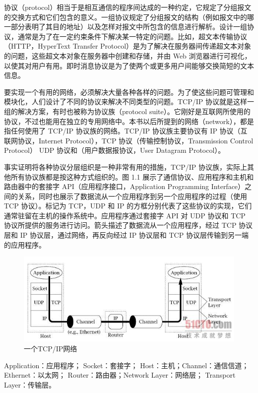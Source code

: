 		协议（protocol）相当于是相互通信的程序间达成的一种约定，它规定了分组报文的交换方式和它们包含的意义。一组协议规定了分组报文的结构（例如报文中的哪一部分表明了其目的地址）以及怎样对报文中所包含的信息进行解析。设计一组协议，通常是为了在一定约束条件下解决某一特定的问题。比如，超文本传输协议（HTTP，HyperText Transfer Protocol）是为了解决在服务器间传递超文本对象的问题，这些超文本对象在服务器中创建和存储，并由 Web 浏览器进行可视化，以使其对用户有用。即时消息协议是为了使两个或更多用户间能够交换简短的文本信息。

		要实现一个有用的网络，必须解决大量各种各样的问题。为了使这些问题可管理和模块化，人们设计了不同的协议来解决不同类型的问题。TCP/IP 协议就是这样一组的解决方案，有时也被称为协议族（protocol suite）。它刚好是互联网所使用的协议，不过也能用在独立的专用网络中。本书以后所提到的网络（network），都是指任何使用了 TCP/IP 协议族的网络。TCP/IP 协议族主要协议有 IP 协议（互联网协议，Internet Protocol），TCP 协议（传输控制协议，Transmission Control Protocol） UDP 协议和（用户数据报协议，User Datagram Protocol）。

		事实证明将各种协议分层组织是一种非常有用的措施，TCP/IP 协议族，实际上其他所有协议族都是按这种方式组织的。图 1.1 展示了通信协议、应用程序和主机和路由器中的套接字 API（应用程序接口，Application Programming Interface）之间的关系，同时也展示了数据流从一个应用程序到另一个应用程序的过程（使用 TCP 协议）。标记为 TCP，UDP 和 IP 的方框分别代表了这些协议的实现，它们通常驻留在主机的操作系统中。应用程序通过套接字 API 对 UDP 协议和 TCP 协议所提供的服务进行访问。箭头描述了数据流从一个应用程序，经过 TCP 协议层和 IP 协议层，通过网络，再反向经过 IP 协议层和 TCP 协议层传输到另一端的应用程序。

		\clearpage

		\begin{figure}[htbp]%
			\centering
			\includegraphics[scale=.6]{img/01.01.jpg}
			\caption{一个TCP/IP网络}
			\label{fig:tcpip.net.trans}
		\end{figure}

		Application：应用程序； Socket：套接字； Host：主机；Channel：通信信道； Ethernet：以太网； Router：路由器；Network Layer：网络层； Transport Layer：传输层。

